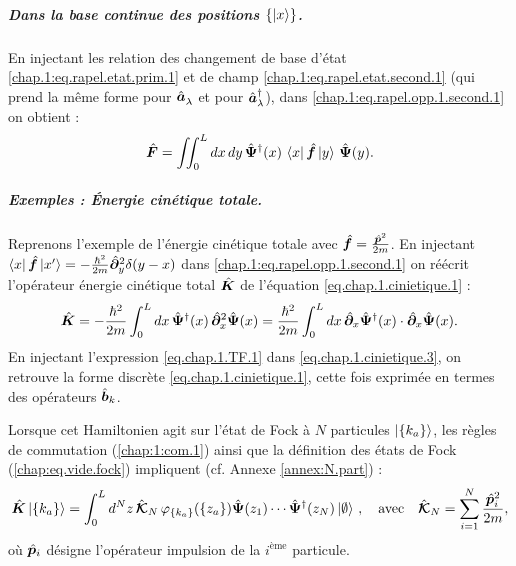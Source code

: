 \subparagraph{Dans la base continue des positions \( \{ \ket{x} \} \).}
En injectant les relation des changement de base d'état
\eqref{chap.1:eq.rapel.etat.prim.1} et de champ \eqref{chap.1:eq.rapel.etat.second.1} (qui prend la même forme pour $\hat{\bm{a}}_\lambda^{}$ et pour $\hat{\bm{a}}_\lambda^\dagger$), dans \eqref{chap.1:eq.rapel.opp.1.second.1} on obtient :
\begin{eqnarray}\label{chap.1:eq.rapel.opp.1.second.1}
\hat{\bm{F}} = \iint_0^L dx \, dy \, \hat{\bm{\Psi}}^\dagger(x) \, \bra{ x} \hat{\bm{f}} \ket{y} \, \hat{\bm{\Psi}}(y).
\end{eqnarray}%
\begin{mdframed}[
	linewidth=0.5pt, 
	backgroundcolor=gray!5, 
	roundcorner=50pt,	
	innerleftmargin=5pt,
    innerrightmargin=5pt,
    innertopmargin=-10pt,
    innerbottommargin=2pt,
    leftmargin=2pt,
    rightmargin=2pt
]
\subparagraph{Exemples : Énergie cinétique totale.}
Reprenons l'exemple de l'énergie cinétique totale avec  $\hat{\bm{f}} = \frac{\hat{\bm{p}}^2}{2m}$. En injectant $\bra{x} \hat{\bm{f}} \ket{x'} = - \frac{\hbar^2}{2m} \hat{\bm{\partial}}_{y}^2 \delta ( y - x )$ dans \eqref{chap.1:eq.rapel.opp.1.second.1} on réécrit l'opérateur énergie cinétique total $\hat{\bm{K}}$ de l'équation \eqref{eq.chap.1.cinietique.1} :
\begin{eqnarray}
\hat{\bm{K}} =  -\frac{\hbar^2}{2m} \int_0^L dx \, \hat{\bm{\Psi}}^\dagger(x) \, \hat{\bm{\partial}}_x^2 \hat{\bm{\Psi}}(x)
= \frac{\hbar^2}{2m} \int_0^L dx \, \hat{\bm{\partial}}_x \hat{\bm{\Psi}}^\dagger(x) \cdot \hat{\bm{\partial}}_x \hat{\bm{\Psi}}(x). \label{eq.chap.1.cinietique.3}
\end{eqnarray}
En injectant l'expression \eqref{eq.chap.1.TF.1} dans \eqref{eq.chap.1.cinietique.3}, on retrouve la forme discrète \eqref{eq.chap.1.cinietique.1}, cette fois exprimée en termes des opérateurs $\hat{\bm{b}}_k$.

Lorsque cet Hamiltonien agit sur l’état de Fock à $N$ particules $\ket{\{k_a\}}$, les règles de commutation (\ref{chap:1:com.1}) ainsi que la définition des états de Fock (\ref{chap:eq.vide.fock}) impliquent (cf. Annexe \ref{annex:N.part}) :
\begin{eqnarray}
\hat{\bm{K}}\ket{ \{k_a\}} =  \int_0^L d^N z \, \hat{\bm{\mathcal{K}}}_N \, \varphi_{\{k_a\}}(\{z_a\} ) \hat{\bm{\Psi}}(z_1) \cdots \hat{\bm{\Psi}}^\dag(z_N) \ket{\emptyset}\, , \quad \mbox{avec} \quad \hat{\bm{\mathcal{K}}}_N = \sum_{i=1}^N \frac{\hat{\bm{p}}_i^2}{2m}, 
\end{eqnarray}
où \( \hat{\bm{p}}_i \) désigne l’opérateur impulsion de la \( i^\text{ème} \) particule.
\end{mdframed}

